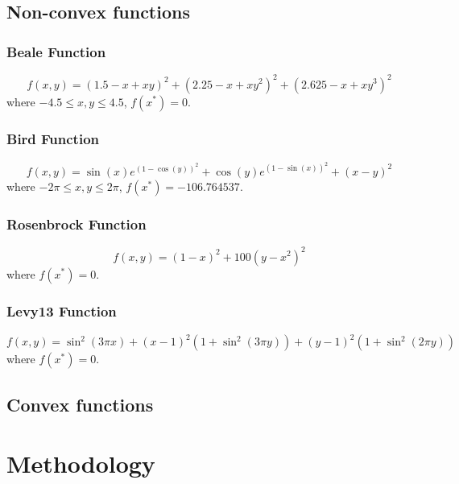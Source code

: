 \documentclass{article}
\begin{document}
\subsection{Non-convex functions}

\subsubsection{Beale Function}
\begin{equation}
f(x,y) = (1.5 - x + xy)^2 + (2.25 - x + xy^2)^2 + (2.625 - x + xy^3)^2	
\end{equation}
where $-4.5\le x,y \le 4.5$, $f(x^*)=0$.

\subsubsection{Bird Function}
\begin{equation}
f(x,y) = \sin(x)e^{(1-\cos(y))^2} + \cos(y)e^{(1-\sin(x))^2} + (x-y)^2
\end{equation}
where $-2\pi \le x,y \le 2\pi$, $f(x^*)=-106.764537$.

\subsubsection{Rosenbrock Function}
\begin{equation}
f(x,y) = (1-x)^2 + 100(y-x^2)^2
\end{equation}
where $f(x^*)=0$.

\subsubsection{Levy13 Function}
\begin{equation}
f(x,y) = \sin^2(3\pi x) + (x-1)^2\left(1+\sin^2(3\pi y)\right) + (y-1)^2\left(1+\sin^2(2\pi y)\right)
\end{equation}
where $f(x^*)=0$.

\subsection{Convex functions}




\section{Methodology}\label{experiments}
\end{document}
